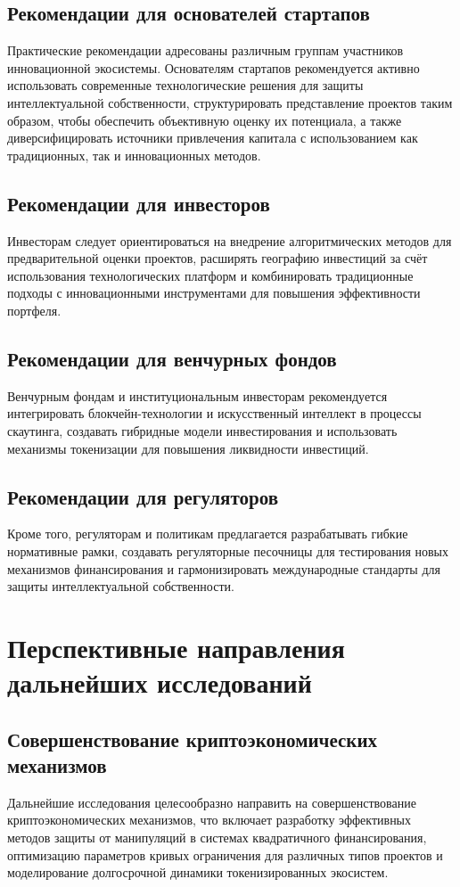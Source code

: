 \documentclass[
    candidate, %
    subf, %
    dotsinheaders=false,
]{disser}
\begin{document}
\subsection{Рекомендации для основателей стартапов}
Практические рекомендации адресованы различным группам участников инновационной экосистемы. Основателям стартапов рекомендуется активно использовать современные технологические решения для защиты интеллектуальной собственности, структурировать представление проектов таким образом, чтобы обеспечить объективную оценку их потенциала, а также диверсифицировать источники привлечения капитала с использованием как традиционных, так и инновационных методов.

\subsection{Рекомендации для инвесторов}
Инвесторам следует ориентироваться на внедрение алгоритмических методов для предварительной оценки проектов, расширять географию инвестиций за счёт использования технологических платформ и комбинировать традиционные подходы с инновационными инструментами для повышения эффективности портфеля.

\subsection{Рекомендации для венчурных фондов}
Венчурным фондам и институциональным инвесторам рекомендуется интегрировать блокчейн-технологии и искусственный интеллект в процессы скаутинга, создавать гибридные модели инвестирования и использовать механизмы токенизации для повышения ликвидности инвестиций.

\subsection{Рекомендации для регуляторов}
Кроме того, регуляторам и политикам предлагается разрабатывать гибкие нормативные рамки, создавать регуляторные песочницы для тестирования новых механизмов финансирования и гармонизировать международные стандарты для защиты интеллектуальной собственности.

\section{Перспективные направления дальнейших исследований}

\subsection{Совершенствование криптоэкономических механизмов}
Дальнейшие исследования целесообразно направить на совершенствование криптоэкономических механизмов, что включает разработку эффективных методов защиты от манипуляций в системах квадратичного финансирования, оптимизацию параметров кривых ограничения для различных типов проектов и моделирование долгосрочной динамики токенизированных экосистем.
\end{document}
